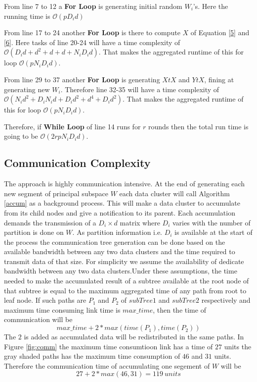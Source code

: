\documentclass[10pt,conference,letterpaper]{IEEEtran}
\begin{document}
From line 7 to 12 a \textbf{For Loop} is generating initial random $W_i$'s. Here the running time is $\mathcal{O}(pD_id)$

From line 17 to 24 another \textbf{For Loop} is there to compute $X$ of Equation \ref{5} and \ref{6}. Here tasks of line 20-24 will have a time complexity of $\mathcal{O}(D_id+d^2+d+d+N_iD_id)$. That makes the aggregated runtime of this for loop $\mathcal{O}(pN_iD_id)$.

From line 29 to 37 another \textbf{For Loop} is generating $XtX$ and $YtX$, fining at generating new $W_i$. Therefore line 32-35 will have a time complexity of $\mathcal{O}(N_id^2 + D_iN_id+D_id^2+d^4 + D_id^2)$. That makes the aggregated runtime of this for loop $\mathcal{O}(pN_iD_id)$.

Therefore, if \textbf{While Loop} of line 14 runs for $r$ rounds then the total run time is going to be $\mathcal{O}(2rpN_iD_id)$.

\subsection{Communication Complexity}
The approach is highly communication intensive. At the end of generating each new segment of principal subspace $W$ each data cluster will call Algorithm \ref{accum} as a background process. This will make a data cluster to accumulate from its child nodes and give a notification to its parent. Each accumulation demands the transmission of a $D_i \times d$ matrix where $D_i$ varies with the number of partition is done on $W$. As partition information i.e. $D_i$ is available at the start of the process the communication tree generation can be done based on the available bandwidth between any two data clusters and the time required to transmit data of that size. For simplicity we assume the availability of dedicate bandwidth between any two data clusters.Under these assumptions, the time needed to make the accumulated result of a subtree available at the root node of that subtree is equal to the maximum aggregated time of any path from root to leaf node. If such paths are $P_1$ and $P_2$ of $subTree1$ and $subTree2$ respectively and maximum time consuming link time is $max\_time$, then the time of communication will be $$max\_time+2*max(time(P_1),time(P_2))$$ 
The $2$ is added as accumulated data will be redistributed in the same paths. In Figure \ref{fig:comm} the maximum time consumtioon link has a time of $27$ units the gray shaded paths has the maximum time consumption of $46$ and $31$ units. Therefore the communication time of accumulating one segement of $W$ will be $$27+2*max(46,31) = 119\ units$$ 
\end{document}
